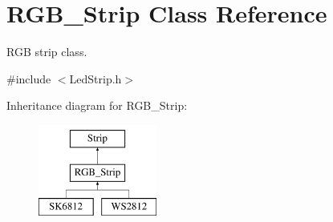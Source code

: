 \hypertarget{classRGB__Strip}{}\section{R\+G\+B\+\_\+\+Strip Class Reference}
\label{classRGB__Strip}


R\+GB strip class.  




{\ttfamily \#include $<$Led\+Strip.\+h$>$}

Inheritance diagram for R\+G\+B\+\_\+\+Strip\+:\begin{figure}[H]
\begin{center}
\leavevmode
\includegraphics[height=3.000000cm]{classRGB__Strip}
\end{center}
\end{figure}
